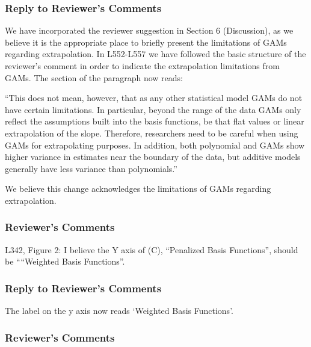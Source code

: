 \documentclass[
]{article}
\begin{document}
\hypertarget{section-44}{%
\subsubsection{\texorpdfstring{\textcolor{reviewersblue} {Reply to Reviewer's Comments}}{}}\label{section-44}}

We have incorporated the reviewer suggestion in Section 6 (Discussion), as we believe it is the appropriate place to briefly present the limitations of GAMs regarding extrapolation. In L552-L557 we have followed the basic structure of the reviewer's comment in order to indicate the extrapolation limitations from GAMs. The section of the paragraph now reads:

``This does not mean, however, that as any other statistical model GAMs do not have certain limitations. In particular, beyond the range of the data GAMs only reflect the assumptions built into the basis functions, be that flat values or linear extrapolation of the slope. Therefore, researchers need to be careful when using GAMs for extrapolating purposes. In addition, both polynomial and GAMs show higher variance in estimates near the boundary of the data, but additive models generally have less variance than polynomials.''

We believe this change acknowledges the limitations of GAMs regarding extrapolation.

\hypertarget{reviewers-comments-41}{%
\subsubsection{Reviewer's Comments}\label{reviewers-comments-41}}

L342, Figure 2: I believe the Y axis of (C), ``Penalized Basis Functions'', should be ````Weighted Basis Functions''.

\hypertarget{section-45}{%
\subsubsection{\texorpdfstring{\textcolor{reviewersblue} {Reply to Reviewer's Comments}}{}}\label{section-45}}

The label on the y axis now reads `Weighted Basis Functions'.

\hypertarget{reviewers-comments-42}{%
\subsubsection{Reviewer's Comments}\label{reviewers-comments-42}}
\end{document}
